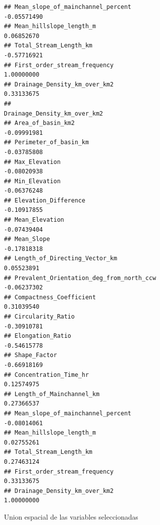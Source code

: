 \documentclass[11pt,]{article}
\newenvironment{Shaded}{\begin{snugshade}}{\end{snugshade}}
\newcommand{\KeywordTok}[1]{\textcolor[rgb]{0.13,0.29,0.53}{\textbf{#1}}}
\newcommand{\DataTypeTok}[1]{\textcolor[rgb]{0.13,0.29,0.53}{#1}}
\newcommand{\StringTok}[1]{\textcolor[rgb]{0.31,0.60,0.02}{#1}}
\newcommand{\OperatorTok}[1]{\textcolor[rgb]{0.81,0.36,0.00}{\textbf{#1}}}
\newcommand{\NormalTok}[1]{#1}
\begin{document}
\begin{verbatim}
## Mean_slope_of_mainchannel_percent                         -0.05571490
## Mean_hillslope_length_m                                    0.06852670
## Total_Stream_Length_km                                    -0.57716921
## First_order_stream_frequency                               1.00000000
## Drainage_Density_km_over_km2                               0.33133675
##                                          Drainage_Density_km_over_km2
## Area_of_basin_km2                                         -0.09991981
## Perimeter_of_basin_km                                     -0.03785808
## Max_Elevation                                             -0.08020938
## Min_Elevation                                             -0.06376248
## Elevation_Difference                                      -0.10917855
## Mean_Elevation                                            -0.07439404
## Mean_Slope                                                -0.17818318
## Length_of_Directing_Vector_km                              0.05523891
## Prevalent_Orientation_deg_from_north_ccw                  -0.06237302
## Compactness_Coefficient                                    0.31039540
## Circularity_Ratio                                         -0.30910781
## Elongation_Ratio                                          -0.54615778
## Shape_Factor                                              -0.66918169
## Concentration_Time_hr                                      0.12574975
## Length_of_Mainchannel_km                                   0.27366537
## Mean_slope_of_mainchannel_percent                         -0.08014061
## Mean_hillslope_length_m                                    0.02755261
## Total_Stream_Length_km                                     0.27463124
## First_order_stream_frequency                               0.33133675
## Drainage_Density_km_over_km2                               1.00000000
\end{verbatim}

Union espacial de las variables seleccionadas

\begin{Shaded}
\end{Shaded}
\end{document}
